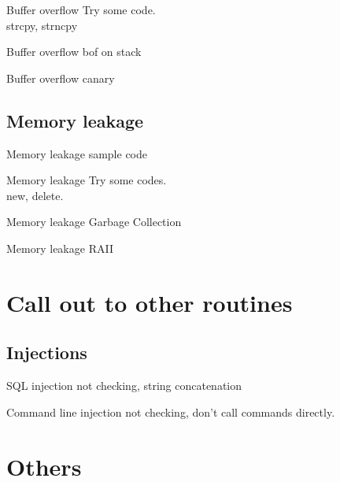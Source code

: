 \documentclass{beamer}
\begin{document}
\begin{CJK*}{UTF8}{bsmi}
    \begin{frame}{Buffer overflow}
        Try some code.\\
        strcpy, strncpy
    \end{frame}

    \begin{frame}{Buffer overflow}
        bof on stack
    \end{frame}

    \begin{frame}{Buffer overflow}
        canary
    \end{frame}

    \subsection{Memory leakage}
    \begin{frame}{Memory leakage}
        sample code
    \end{frame}

    \begin{frame}{Memory leakage}
        Try some codes.\\
        new, delete.
    \end{frame}

    \begin{frame}{Memory leakage}
        Garbage Collection
    \end{frame}

    \begin{frame}{Memory leakage}
        RAII
    \end{frame}

    \section{Call out to other routines}
    \subsection{Injections}
    \begin{frame}{SQL injection}
        not checking, string concatenation
    \end{frame}

    \begin{frame}{Command line injection}
        not checking, don't call commands directly.
    \end{frame}

    \section{Others}

\end{CJK*}
\end{document}
